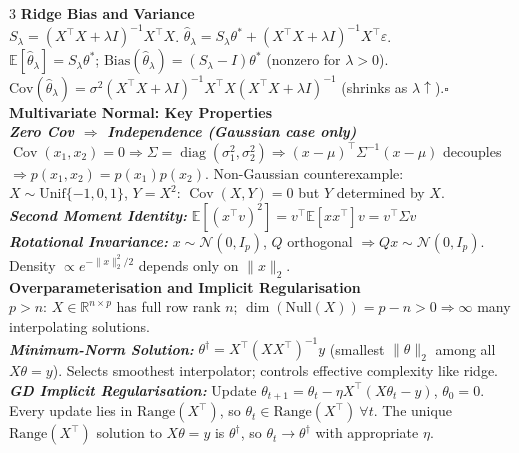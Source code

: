 \documentclass[a4paper,7pt]{article}
\begin{document}
\begin{multicols*}{3}
\textbf{Ridge Bias and Variance}\\
$S_\lambda=(X^\top X+\lambda I)^{-1}X^\top X$. $\hat\theta_\lambda=S_\lambda\theta^*+(X^\top X+\lambda I)^{-1}X^\top\varepsilon$.\\
$\mathbb{E}[\hat\theta_\lambda]=S_\lambda\theta^*$; $\mathrm{Bias}(\hat\theta_\lambda)=(S_\lambda-I)\theta^*$ (nonzero for $\lambda>0$).\\
$\mathrm{Cov}(\hat\theta_\lambda)=\sigma^2(X^\top X+\lambda I)^{-1}X^\top X(X^\top X+\lambda I)^{-1}$ (shrinks as $\lambda\uparrow$).\hfill$\square$\\

\textbf{Multivariate Normal: Key Properties}\\

\textit{\textbf{Zero Cov $\Rightarrow$ Independence (Gaussian case only)}}\\
$\operatorname{Cov}(x_1,x_2)=0\Rightarrow\Sigma=\operatorname{diag}(\sigma_1^2,\sigma_2^2)\Rightarrow(x-\mu)^\top\Sigma^{-1}(x-\mu)$ decouples $\Rightarrow p(x_1,x_2)=p(x_1)p(x_2)$. Non-Gaussian counterexample: $X\sim\mathrm{Unif}\{-1,0,1\}$, $Y=X^2$: $\operatorname{Cov}(X,Y)=0$ but $Y$ determined by $X$.\\

\textit{\textbf{Second Moment Identity:}} $\mathbb{E}[(x^\top v)^2]=v^\top\mathbb{E}[xx^\top]v=v^\top\Sigma v$\\

\textit{\textbf{Rotational Invariance:}} $x\sim\mathcal{N}(0,I_p)$, $Q$ orthogonal $\Rightarrow Qx\sim\mathcal{N}(0,I_p)$. Density $\propto e^{-\|x\|_2^2/2}$ depends only on $\|x\|_2$.\\

\textbf{Overparameterisation and Implicit Regularisation}\\
$p>n$: $X\in\mathbb{R}^{n\times p}$ has full row rank $n$; $\dim(\mathrm{Null}(X))=p-n>0\Rightarrow\infty$ many interpolating solutions.\\

\textit{\textbf{Minimum-Norm Solution:}} $\theta^\dagger=X^\top(XX^\top)^{-1}y$ (smallest $\|\theta\|_2$ among all $X\theta=y$). Selects smoothest interpolator; controls effective complexity like ridge.\\

\textit{\textbf{GD Implicit Regularisation:}} Update $\theta_{t+1}=\theta_t-\eta X^\top(X\theta_t-y)$, $\theta_0=0$. Every update lies in $\mathrm{Range}(X^\top)$, so $\theta_t\in\mathrm{Range}(X^\top)\ \forall t$. The unique $\mathrm{Range}(X^\top)$ solution to $X\theta=y$ is $\theta^\dagger$, so $\theta_t\to\theta^\dagger$ with appropriate $\eta$.\\


\end{multicols*}
\end{document}

